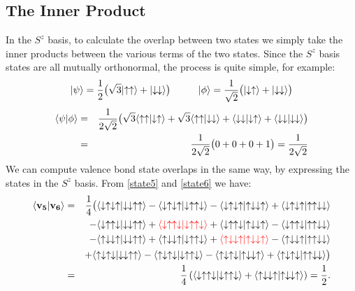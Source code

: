 \subsection{The Inner Product}

In the $S^z$ basis, to calculate the overlap between two states we simply take the inner products 
between the various terms of the two states.  
Since the $S^z$ basis states are all mutually orthonormal, the process is quite simple, for example:
\begin{equation*}
\ket{\psi} = \frac{1}{2}\big(\sqrt{3}\ket{\up\up} + \ket{\dw\dw}\big) \hspace{1cm}
\ket{\phi} = \frac{1}{\sqrt{2}} \big(\ket{\dw\up} + \ket{\dw\dw}\big) \nonumber
\end{equation*}
\begin{eqnarray}
\inn{\psi}{\phi}&=& \frac{1}{2\sqrt{2}}\big(
		\sqrt{3}\inn{\up\up}{\dw\up} + \sqrt{3}\inn{\up\up}{\dw\dw} +
		\inn{\dw\dw}{\dw\up} + \inn{\dw\dw}{\dw\dw}
		\big) \nonumber \\
		&=& \frac{1}{2\sqrt{2}}\big(
		0 + 0 +
		0 +1
		\big)
		= \frac{1}{2\sqrt{2}}
\end{eqnarray}
We can compute valence bond state overlaps in the same way, by expressing the states in the
$S^z$ basis.  From \eqref{state5} and \eqref{state6} we have:
\begin{eqnarray}
\inn{\mathbf{v_5}}{\mathbf{v_6}} &=& 	 
	 \frac{1}{4} 
	 \big(	
		\inn{\dw\up\dw\up}{\dw\dw\up\up} - \inn{\dw\up\dw\up}{\dw\up\up\dw} \nonumber
		- \inn{\dw\up\dw\up}{\up\dw\dw\up} + \inn{\dw\up\dw\up}{\up\up\dw\dw} \\				
		&&-\inn{\dw\up\up\dw}{\dw\dw\up\up} + \comment{\inn{\dw\up\up\dw}{\dw\up\up\dw}}
		+ \inn{\dw\up\up\dw}{\up\dw\dw\up} - \inn{\dw\up\up\dw}{\up\up\dw\dw}	\nonumber\\	
		&&-\inn{\up\dw\dw\up}{\dw\dw\up\up} + \inn{\up\dw\dw\up}{\dw\up\up\dw}\nonumber
	+\comment{ \inn{\up\dw\dw\up}{\up\dw\dw\up}} - \inn{\up\dw\dw\up}{\up\up\dw\dw}	\\	
		&&+\inn{\up\dw\up\dw}{\dw\dw\up\up} - \inn{\up\dw\up\dw}{\dw\up\up\dw}
		- \inn{\up\dw\up\dw}{\up\dw\dw\up} + \inn{\up\dw\up\dw}{\up\up\dw\dw}
	 \big) \\	 
	&=& \frac{1}{4} \nonumber
	\left(
		\inn{\dw\up\up\dw}{\dw\up\up\dw} + \inn{\up\dw\dw\up}{\up\dw\dw\up}
	 \right) 
	 = \frac{1}{2}.\nonumber
\end{eqnarray}
